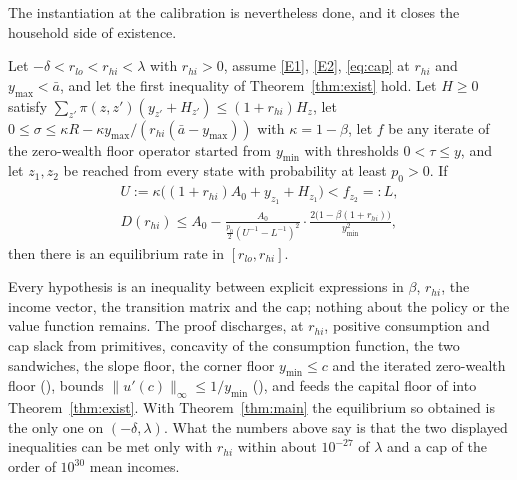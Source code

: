 The instantiation at the calibration is nevertheless done, and it closes the household side of
existence.

\begin{theorem}\label{thm:existprim}
Let $-\delta<r_{lo}<r_{hi}<\lambda$ with $r_{hi}>0$, assume \ref{E1}, \ref{E2}, \eqref{eq:cap}
at $r_{hi}$ and $y_{\max}<\bar a$, and let the first inequality of Theorem~\ref{thm:exist} hold.
Let $H\ge0$ satisfy $\sum_{z'}\pi(z,z')(y_{z'}+H_{z'})\le(1+r_{hi})H_z$, let
$0\le\sigma\le\kappa R-\kappa y_{\max}/(r_{hi}(\bar a-y_{\max}))$ with $\kappa=1-\beta$, let
$f$ be any iterate of the zero-wealth floor operator started from $y_{\min}$ with thresholds
$0<\tau\le y$, and let $z_1,z_2$ be reached from every state with probability at least $p_0>0$.
If
\begin{gather*}
  U:=\kappa\bigl((1+r_{hi})A_0+y_{z_1}+H_{z_1}\bigr)<f_{z_2}=:L,\\
  D(r_{hi})\le A_0-\frac{A_0}{\tfrac{p_0}{2}(U^{-1}-L^{-1})^2}\cdot
    \frac{2\bigl(1-\beta(1+r_{hi})\bigr)}{y_{\min}^2},
\end{gather*}
then there is an equilibrium rate in $[r_{lo},r_{hi}]$.
\end{theorem}

Every hypothesis is an inequality between explicit expressions in $\beta$, $r_{hi}$, the income
vector, the transition matrix and the cap; nothing about the policy or the value function remains.
The proof discharges, at $r_{hi}$, positive consumption and cap slack from primitives, concavity
of the consumption function, the two sandwiches, the slope floor, the corner floor $y_{\min}\le c$
and the iterated zero-wealth floor (), bounds $\|u'(c)\|_\infty\le
1/y_{\min}$ (), and feeds the capital floor of
 into Theorem~\ref{thm:exist}. With
Theorem~\ref{thm:main} the equilibrium so obtained is the only one on $(-\delta,\lambda)$. What
the numbers above say is that the two displayed inequalities can be met only with $r_{hi}$
within about $10^{-27}$ of $\lambda$ and a cap of the order of $10^{30}$ mean incomes.

